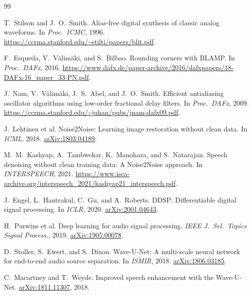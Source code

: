 \documentclass[10pt,twocolumn,letterpaper]{article}
\begin{document}
\FloatBarrier
\raggedbottom
\balance
{\footnotesize
\setlength{\baselineskip}{11.5pt}
\begin{thebibliography}{99}
\setlength{\itemsep}{0.25ex plus 0.05ex}
\setlength{\parsep}{0pt}
\setlength{\parskip}{0pt}

T.~Stilson and J.~O.~Smith.
\newblock Alias-free digital synthesis of classic analog waveforms.
\newblock In \emph{Proc.\ ICMC}, 1996.
\newblock \url{https://ccrma.stanford.edu/~stilti/papers/blit.pdf}.

F.~Esqueda, V.~V\"alim\"aki, and S.~Bilbao.
\newblock Rounding corners with BLAMP.
\newblock In \emph{Proc.\ DAFx}, 2016.
\newblock \url{https://www.dafx.de/paper-archive/2016/dafxpapers/18-DAFx-16_paper_33-PN.pdf}.

J.~Nam, V.~V\"alim\"aki, J.~S.~Abel, and J.~O.~Smith.
\newblock Efficient antialiasing oscillator algorithms using low-order fractional delay filters.
\newblock In \emph{Proc.\ DAFx}, 2009.
\newblock \url{https://ccrma.stanford.edu/~juhan/pubs/jnam-dafx09.pdf}.

J.~Lehtinen et al.
\newblock Noise2Noise: Learning image restoration without clean data.
\newblock In \emph{ICML}, 2018.
\newblock \href{https://arxiv.org/abs/1803.04189}{arXiv:1803.04189}.

M.~M.~Kashyap, A.~Tambwekar, K.~Manohara, and S.~Natarajan.
\newblock Speech denoising without clean training data: A Noise2Noise approach.
\newblock In \emph{INTERSPEECH}, 2021.
\newblock \url{https://www.isca-archive.org/interspeech_2021/kashyap21_interspeech.pdf}.

J.~Engel, L.~Hantrakul, C.~Gu, and A.~Roberts.
\newblock DDSP: Differentiable digital signal processing.
\newblock In \emph{ICLR}, 2020.
\newblock \href{https://arxiv.org/abs/2001.04643}{arXiv:2001.04643}.

H.~Purwins et al.
\newblock Deep learning for audio signal processing.
\newblock \emph{IEEE J.\ Sel.\ Topics Signal Process.}, 2019.
\newblock \href{https://arxiv.org/abs/1905.00078}{arXiv:1905.00078}.

D.~Stoller, S.~Ewert, and S.~Dixon.
\newblock Wave-U-Net: A multi-scale neural network for end-to-end audio source separation.
\newblock In \emph{ISMIR}, 2018.
\newblock \href{https://arxiv.org/abs/1806.03185}{arXiv:1806.03185}.

C.~Macartney and T.~Weyde.
\newblock Improved speech enhancement with the Wave-U-Net.
\newblock \href{https://arxiv.org/abs/1811.11307}{arXiv:1811.11307}, 2018.


\end{thebibliography}}
\end{document}
